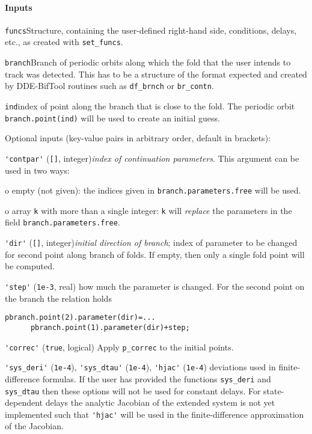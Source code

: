 \documentclass[11pt]{scrartcl}
\newcommand{\mlvar}[1]{\lstinline[keywordstyle=\color{var}]!#1!}
\newcommand{\blist}[1]{\mbox{\lstinline!#1!}}
\begin{document}
\paragraph{Inputs}
\begin{compactitem}
\item \blist{funcs}\quad Structure, containing the user-defined right-hand
  side, conditions, delays, etc., as created with \blist{set_funcs}.
\item \blist{branch}\quad Branch of periodic orbits along which the
  fold that the user intends to track was detected. This has to be a
  structure of the format expected and created by DDE-BifTool routines
  such as \blist{df_brnch} or \blist{br_contn}.
\item \blist{ind}\quad index of point along the branch that is close
  to the fold. The periodic orbit \blist{branch.point(ind)} will be
  used to create an initial guess.
\item Optional inputs (key-value pairs in arbitrary order, default in
  brackets):
  \begin{compactitem}
  \item \blist{'contpar'} (\blist{[]}, integer)\quad \emph{index
    of continuation parameters}. This argument can be used in two
    ways:
    \begin{compactitem}
    \item[o] empty (not given): the indices given in
      \blist{branch.parameters.free} will be used.
    \item[o]  array \blist{k} with more than a single integer:  \blist{k}
    will \emph{replace} the parameters in the field
    \blist{branch.parameters.free}.
    \end{compactitem}
  \item \blist{'dir'} (\blist{[]}, integer)\quad \emph{initial direction of
      branch}; index of parameter to be changed for second point along
    branch of folds. If empty, then only a single fold point will be
    computed.
  \item \blist{'step'} (\blist{1e-3}, real) how much the parameter is
    changed. For the second point on the branch the relation holds
    \begin{lstlisting}
pbranch.point(2).parameter(dir)=...
      pbranch.point(1).parameter(dir)+step;
    \end{lstlisting}
  \item \blist{'correc'} (\blist{true}, logical) Apply
    \blist{p_correc} to the initial points.
  \item \blist{'sys_deri'} (\blist{1e-4}), \blist{'sys_dtau'}
    (\blist{1e-4}), \blist{'hjac'} (\blist{1e-4}) deviations used in
    finite-difference formulas. If the user has provided the functions
    \mlvar{sys_deri} and \mlvar{sys_dtau} then these options will not
    be used for constant delays. For state-dependent delays the
    analytic Jacobian of the extended system is not yet implemented
    such that \blist{'hjac'} will be used in the finite-difference
    approximation of the Jacobian.
  \end{compactitem}
\end{compactitem}
\end{document}
